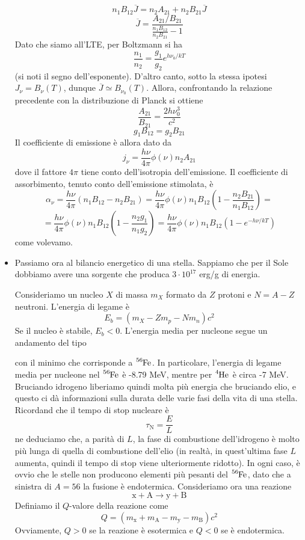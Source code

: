 \documentclass[a4paper,11pt]{article}
\theoremstyle{theorem}
\theoremstyle{definition}
\begin{document}
\begin{itemize}
		\[n_1B_{12}\overline{J}=n_2A_{21}+n_2B_{21}\overline{J}\]
		\[\overline{J}=\frac{A_{21}/B_{21}}{\frac{n_1B_{12}}{n_2B_{21}}-1}\]
		Dato che siamo all'LTE, per Boltzmann si ha
		\[\frac{n_1}{n_2}=\frac{g_1}{g_2}e^{h\nu_0/kT}\]
		(si noti il segno dell'esponente). D'altro canto, sotto la stessa ipotesi $J_\nu=B_\nu(T)$, dunque $\overline{J}\simeq B_{\nu_0}(T)$. Allora, confrontando la relazione precedente con la distribuzione di Planck si ottiene
		\[\frac{A_{21}}{B_{21}}=\frac{2h\nu_0^3}{c^2}\]
		\[g_1B_{12}=g_2B_{21}\]
		Il coefficiente di emissione è allora dato da
		\[j_\nu=\frac{h\nu}{4\pi}\phi(\nu)n_2A_{21}\]
		dove il fattore $4\pi$ tiene conto dell'isotropia dell'emissione. Il coefficiente di assorbimento, tenuto conto dell'emissione stimolata, è
		\[\alpha_\nu=\frac{h\nu}{4\pi}(n_1B_{12}-n_2B_{21})=\frac{h\nu}{4\pi}\phi(\nu)n_1B_{12}\left(1-\frac{n_2B_{21}}{n_1B_{12}}\right)=\]\[=\frac{h\nu}{4\pi}\phi(\nu)n_1B_{12}\left(1-\frac{n_2g_1}{n_1g_2}\right)=\frac{h\nu}{4\pi}\phi(\nu)n_1B_{12}\left(1-e^{-h\nu/kT}\right)\]
		come volevamo. 
		\item Passiamo ora al bilancio energetico di una stella. Sappiamo che per il Sole dobbiamo avere una sorgente che produca $3\cdot10^{17}$ erg/g di energia.
		
		\noindent Consideriamo un nucleo $X$ di massa $m_X$ formato da $Z$ protoni e $N=A-Z$ neutroni. L'energia di legame è
		\[E_b=(m_X-Zm_p-Nm_n)c^2\]
		Se il nucleo è stabile, $E_b<0$. L'energia media per nucleone segue un andamento del tipo
		\begin{figure}[h]
			\centering
		\end{figure}
		
		con il minimo che corrisponde a $\tensor[^{56}]{\mathrm{Fe}}{}$. In particolare, l'energia di legame media per nucleone nel $\tensor[^{56}]{\mathrm{Fe}}{}$ è -8.79 MeV, mentre per $\tensor[^{4}]{\mathrm{He}}{}$ è circa -7 MeV. Bruciando idrogeno liberiamo quindi molta più energia che bruciando elio, e questo ci dà informazioni sulla durata delle varie fasi della vita di una stella. Ricordand che il tempo di stop nucleare è
		\[\tau_\textrm{N}=\frac{E}{L}\]
		ne deduciamo che, a parità di $L$, la fase di combustione dell'idrogeno è molto più lunga di quella di combustione dell'elio (in realtà, in quest'ultima fase $L$ aumenta, quindi il tempo di stop viene ulteriormente ridotto). In ogni caso, è ovvio che le stelle non producono elementi più pesanti del $\tensor[^{56}]{\mathrm{Fe}}{}$, dato che a sinistra di $A=56$ la fusione è endotermica. Consideriamo ora una reazione
		\[\mathrm{x + A}\rightarrow\mathrm{y + B}\]
		Definiamo il $Q$-valore della reazione come
		\[Q=(m_\mathrm{x}+m_\mathrm{A}-m_\mathrm{y}-m_\mathrm{B})c^2\]
		Ovviamente, $Q>0$ se la reazione è esotermica e $Q<0$ se è endotermica.
		

\end{itemize}
\end{document}

